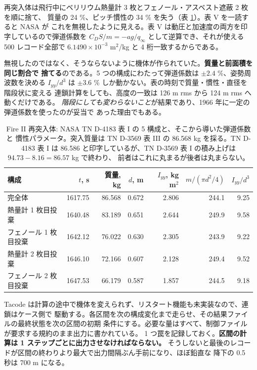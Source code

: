 \documentclass[11pt,a4paper,dvipdfmx]{jsarticle}
\begin{document}
再突入体は飛行中にベリリウム熱量計 3 枚とフェノール・アスベスト遮蔽 2 枚を順に捨て、
質量の 24 \%、ピッチ慣性の 34 \% を失う（表 \ref{fire2_mass}）。表 V を一読すると NASA が
これを無視したように見える。表 V は動圧と加速度の両方を印字しているので弾道係数を
$C_D S/m = -a g / q_\infty$ として逆算でき、それが使える 500 レコード全部で
$6.1490 \times 10^{-3}$ m$^2$/kg と 4 桁一致するからである。

無視したのではなく、そうならないように機体が作られていた。\textbf{質量と前面積を同じ割合で
捨てる}のである。5 つの構成にわたって弾道係数は $\pm 2.4$ \%、姿勢周波数を決める
$I_{yy}/d^3$ は $\pm 3.6$ \% しか動かない。表の時刻で質量・慣性・直径を階段状に変える
連鎖計算をしても、高度の一致は 126 m rms から 124 m rms へ動くだけである。
\emph{階段にしても変わらないこと}が結果であり、1966 年に一定の弾道係数を使ったのが妥当で
あった理由でもある。

\begin{table}[h]
\caption{Fire II 再突入体: NASA TN D-4183 表 I の 5 構成と、そこから導いた弾道係数と
慣性パラメータ。突入質量は TN D-3569 表 III の 86.568 kg を採る。TN D-4183 表 I は
86.586 と印字しているが、TN D-3569 表 I の積み上げは $94.73 - 8.16 = 86.57$ kg で終わり、
前者はこれに丸まるが後者は丸まらない。}
\label{fire2_mass}
\begin{center}
\begin{tabular}{l|r|r|r|r|r|r}
\hline \hline
構成 & $t$, s & 質量, kg & $d$, m & $I_{yy}$, kg m$^2$ & $m/(\pi d^2/4)$ & $I_{yy}/d^3$ \\
\hline
完全体                & 1617.75 & 86.568 & 0.672 & 2.806 & 244.1 & 9.25 \\
熱量計 1 枚目投棄     & 1640.48 & 83.189 & 0.651 & 2.644 & 249.9 & 9.58 \\
フェノール 1 枚目投棄 & 1642.12 & 76.022 & 0.630 & 2.305 & 243.9 & 9.22 \\
熱量計 2 枚目投棄     & 1646.10 & 72.166 & 0.607 & 2.128 & 249.4 & 9.52 \\
フェノール 2 枚目投棄 & 1647.53 & 66.179 & 0.587 & 1.857 & 244.5 & 9.18 \\
\hline \hline
\end{tabular}
\end{center}
\end{table}

Tacode は計算の途中で機体を変えられず、リスタート機能も未実装なので、連鎖はケース側で
駆動する。各区間を次の構成変化まで走らせ、その結果ファイルの最終状態を次の区間の初期
条件にする。必要な量はすべて、制御ファイルが要求する規約のまま出力に書かれている。
1 つ罠を記録しておく。\textbf{区間の計算は 1 ステップごとに出力させなければならない。}
そうしないと最後のレコードが区間の終わりより最大で出力間隔ぶん手前になり、ほぼ鉛直な
降下の 0.5 秒は 700 m になる。
\end{document}
